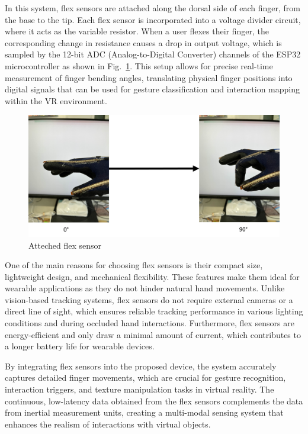 In this system,  flex sensors are attached along the dorsal side of each finger, from the base to the tip. Each flex sensor is incorporated into a voltage divider circuit, where it acts as the variable resistor. When a user flexes their finger, the corresponding change in resistance causes a drop in output voltage, which is sampled by the 12-bit ADC (Analog-to-Digital Converter) channels of the ESP32 microcontroller as shown in Fig.~\ref{fig:flex_sensor_bend}. This setup allows for precise real-time measurement of finger bending angles, translating physical finger positions into digital signals that can be used for gesture classification and interaction mapping within the VR environment.

\begin{figure}[H]\centering
	\includegraphics[width=1\textwidth]{Pictures/flex_sensor_bend.png}%
	\caption{Atteched flex sensor}\label{fig:flex_sensor_bend}%
\end{figure}

One of the main reasons for choosing flex sensors is their compact size, lightweight design, and mechanical flexibility. These features make them ideal for wearable applications as they do not hinder natural hand movements. Unlike vision-based tracking systems, flex sensors do not require external cameras or a direct line of sight, which ensures reliable tracking performance in various lighting conditions and during occluded hand interactions. Furthermore, flex sensors are energy-efficient and only draw a minimal amount of current, which contributes to a longer battery life for wearable devices.

By integrating flex sensors into the proposed device, the system accurately captures detailed finger movements, which are crucial for gesture recognition, interaction triggers, and texture manipulation tasks in virtual reality. The continuous, low-latency data obtained from the flex sensors complements the data from inertial measurement units, creating a multi-modal sensing system that enhances the realism of interactions with virtual objects.

